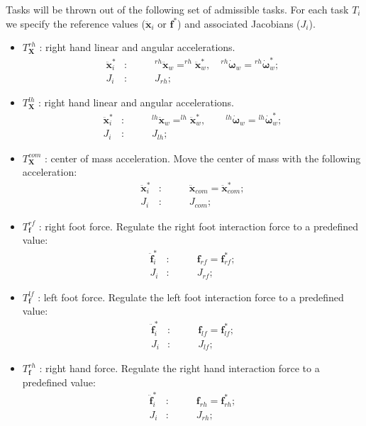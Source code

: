 \documentclass[12pt,a4paper,twoside]{article}
\begin{document}
Tasks will be thrown out  of the following set of admissible tasks. For each task $T_i$ we specify the reference values ($\ddot {\bm x}_i$ or $\bm f^*$) and associated Jacobians ($J_i$). 
\begin{itemize}

\item $T^{rh}_{\bm X}$ : right hand linear and angular accelerations. 
\begin{eqnarray*}
\ddot {\bm x}^*_{i} &:& \qquad ^{rh}{\ddot {\bm x}}_w = ^{rh}{\ddot {\bm x}}^*_w, \quad {}^{rh}{\dot {\bm \omega}}_w = {}^{rh}{\dot {\bm \omega}}_w^*;\\
J_i &:& \qquad J_{rh};
\end{eqnarray*}

\item $T^{lh}_{\bm X}$ : right hand linear and angular accelerations. 
\begin{eqnarray*}
\ddot {\bm x}^*_{i} &:& \qquad ^{lh}{\ddot {\bm x}}_w = ^{lh}{\ddot {\bm x}}^*_w, \qquad {}^{lh}{\dot {\bm \omega}}_w = {}^{lh}{\dot {\bm \omega}}_w^* ;\\
J_i &:& \qquad J_{lh};
\end{eqnarray*}

\item $T^{com}_{\bm X}$ : center of mass acceleration. Move the center of mass with the following acceleration: 
\begin{eqnarray*}
\ddot {\bm x}^*_{i} &:& \qquad \ddot {\bm x}_{com} = \ddot {\bm x}_{com}^* ;\\
J_i &:& \qquad J_{com};
\end{eqnarray*}

\item $T^{rf}_{\bm f}$ : right foot force. Regulate the right foot interaction force to a predefined value: \begin{eqnarray*}
\ddot {\bm f}^*_{i} &:& \qquad {\bm f}_{rf} = {\bm f}^*_{rf} ;\\
J_i &:& \qquad J_{rf};
\end{eqnarray*}

\item $T^{lf}_{\bm f}$ : left foot force. Regulate the left foot interaction force to a predefined value: 
\begin{eqnarray*}
\ddot {\bm f}^*_{i} &:& \qquad {\bm f}_{lf} = {\bm f}^*_{lf} ;\\
J_i &:& \qquad J_{lf};
\end{eqnarray*}

\item $T^{rh}_{\bm f}$ : right hand force. Regulate the right hand interaction force to a predefined value: \begin{eqnarray*}
\ddot {\bm f}^*_{i} &:& \qquad {\bm f}_{rh} = {\bm f}^*_{rh} ;\\
J_i &:& \qquad J_{rh};
\end{eqnarray*}


\end{itemize}
\end{document}
